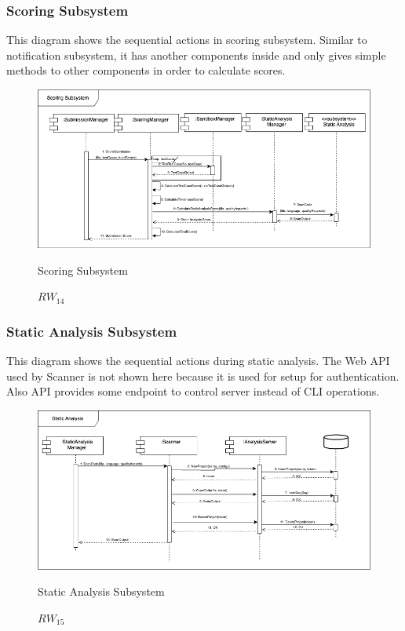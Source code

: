 \subsubsection{Scoring Subsystem}
This diagram shows the sequential actions in scoring subsystem. Similar to notification subsystem, it has another components inside and only gives simple methods to other components in order to calculate scores.
\begin{figure}[H]
    \centering
    \includegraphics[width=\linewidth]{Images/runtime/scoring_subsystem_runtime.drawio.png}
    \caption{$RW_{14}$} Scoring Subsystem
\end{figure}



\subsubsection{Static Analysis Subsystem}
This diagram shows the sequential actions during static analysis. The Web API used by Scanner is not shown here because it is used for setup for authentication. Also API provides some endpoint to control server instead of CLI operations.
\begin{figure}[H]
    \centering
    \includegraphics[width=\linewidth]{Images/runtime/static_analysis.drawio.png}
    \caption{$RW_{15}$} Static Analysis Subsystem
\end{figure}

